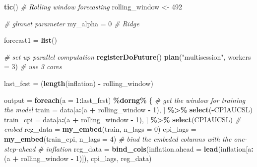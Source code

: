 \documentclass[
]{article}
\newenvironment{Shaded}{\begin{snugshade}}{\end{snugshade}}
\newcommand{\AttributeTok}[1]{\textcolor[rgb]{0.13,0.29,0.53}{#1}}
\newcommand{\CommentTok}[1]{\textcolor[rgb]{0.56,0.35,0.01}{\textit{#1}}}
\newcommand{\DecValTok}[1]{\textcolor[rgb]{0.00,0.00,0.81}{#1}}
\newcommand{\FunctionTok}[1]{\textcolor[rgb]{0.13,0.29,0.53}{\textbf{#1}}}
\newcommand{\NormalTok}[1]{#1}
\newcommand{\OtherTok}[1]{\textcolor[rgb]{0.56,0.35,0.01}{#1}}
\newcommand{\SpecialCharTok}[1]{\textcolor[rgb]{0.81,0.36,0.00}{\textbf{#1}}}
\newcommand{\StringTok}[1]{\textcolor[rgb]{0.31,0.60,0.02}{#1}}
\begin{document}
\begin{Shaded}
\begin{Highlighting}[]
\FunctionTok{tic}\NormalTok{()}
\CommentTok{\# Rolling window forecasting}
\NormalTok{rolling\_window }\OtherTok{\textless{}{-}} \DecValTok{492}

\CommentTok{\# glmnet parameter}
\NormalTok{my\_alpha }\OtherTok{=} \DecValTok{0}  \CommentTok{\# Ridge}

\NormalTok{forecast1 }\OtherTok{=} \FunctionTok{list}\NormalTok{()}

\CommentTok{\# set up parallel computation}
\FunctionTok{registerDoFuture}\NormalTok{()}
\FunctionTok{plan}\NormalTok{(}\StringTok{"multisession"}\NormalTok{, }\AttributeTok{workers =} \DecValTok{3}\NormalTok{)  }\CommentTok{\# use 3 cores }

\NormalTok{last\_fcst }\OtherTok{=}\NormalTok{ (}\FunctionTok{length}\NormalTok{(inflation) }\SpecialCharTok{{-}}\NormalTok{ rolling\_window)}

\NormalTok{output }\OtherTok{=} \FunctionTok{foreach}\NormalTok{(}\AttributeTok{a =} \DecValTok{1}\SpecialCharTok{:}\NormalTok{last\_fcst) }\SpecialCharTok{\%dorng\%}\NormalTok{ \{}
    \CommentTok{\# get the window for training the model}
\NormalTok{    train }\OtherTok{=}\NormalTok{ data[a}\SpecialCharTok{:}\NormalTok{(a }\SpecialCharTok{+}\NormalTok{ rolling\_window }\SpecialCharTok{{-}} \DecValTok{1}\NormalTok{), ] }\SpecialCharTok{\%\textgreater{}\%}
        \FunctionTok{select}\NormalTok{(}\SpecialCharTok{{-}}\NormalTok{CPIAUCSL)}
\NormalTok{    train\_cpi }\OtherTok{=}\NormalTok{ data[a}\SpecialCharTok{:}\NormalTok{(a }\SpecialCharTok{+}\NormalTok{ rolling\_window }\SpecialCharTok{{-}} \DecValTok{1}\NormalTok{), ] }\SpecialCharTok{\%\textgreater{}\%}
        \FunctionTok{select}\NormalTok{(CPIAUCSL)}
    \CommentTok{\# embed}
\NormalTok{    reg\_data }\OtherTok{=} \FunctionTok{my\_embed}\NormalTok{(train, }\AttributeTok{n\_lags =} \DecValTok{0}\NormalTok{)}
\NormalTok{    cpi\_lags }\OtherTok{=} \FunctionTok{my\_embed}\NormalTok{(train\_cpi, }\AttributeTok{n\_lags =} \DecValTok{4}\NormalTok{)}
    \CommentTok{\# bind the embeded columns with the one{-}step{-}ahead}
    \CommentTok{\# inflation}
\NormalTok{    reg\_data }\OtherTok{=} \FunctionTok{bind\_cols}\NormalTok{(}\AttributeTok{inflation.ahead =} \FunctionTok{lead}\NormalTok{(inflation[a}\SpecialCharTok{:}\NormalTok{(a }\SpecialCharTok{+}
\NormalTok{        rolling\_window }\SpecialCharTok{{-}} \DecValTok{1}\NormalTok{)]), cpi\_lags, reg\_data)}


\end{Highlighting}
\end{Shaded}
\end{document}
